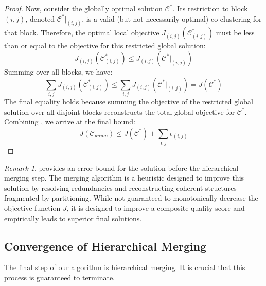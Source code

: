 \documentclass[journal]{IEEEtran}
\theoremstyle{definition}
\theoremstyle{remark} %
\newtheorem{remark}{Remark}
\begin{document}
{\begin{proof}
    Now, consider the globally optimal solution $\mathcal{C}^*$. Its restriction to block $(i,j)$, denoted $\mathcal{C}^*|_{(i,j)}$, is a valid (but not necessarily optimal) co-clustering for that block. Therefore, the optimal local objective $J_{(i,j)}(\mathcal{C}_{(i,j)}^*)$ must be less than or equal to the objective for this restricted global solution:
    \begin{equation} \label{eq:proof_qual3}
        J_{(i,j)}(\mathcal{C}_{(i,j)}^*) \le J_{(i,j)}(\mathcal{C}^*|_{(i,j)})
    \end{equation}
    Summing over all blocks, we have:
    \begin{equation} \label{eq:proof_qual4}
        \sum_{i,j} J_{(i,j)}(\mathcal{C}_{(i,j)}^*) \le \sum_{i,j} J_{(i,j)}(\mathcal{C}^*|_{(i,j)}) = J(\mathcal{C}^*)
    \end{equation}
    The final equality holds because summing the objective of the restricted global solution over all disjoint blocks reconstructs the total global objective for $\mathcal{C}^*$. Combining , we arrive at the final bound:
    \begin{equation}
        J(\mathcal{C}_{union}) \le J(\mathcal{C}^*) + \sum_{i,j} \epsilon_{(i,j)}
    \end{equation}
\end{proof}
\begin{remark}
     provides an error bound for the solution before the hierarchical merging step. The merging algorithm is a heuristic designed to improve this solution by resolving redundancies and reconstructing coherent structures fragmented by partitioning. While not guaranteed to monotonically decrease the objective function $J$, it is designed to improve a composite quality score and empirically leads to superior final solutions.
\end{remark}

\subsection{Convergence of Hierarchical Merging}
\label{subsec:convergence-of-hierarchical-merging}
The final step of our algorithm is hierarchical merging. It is crucial that this process is guaranteed to terminate.

}
\end{document}
